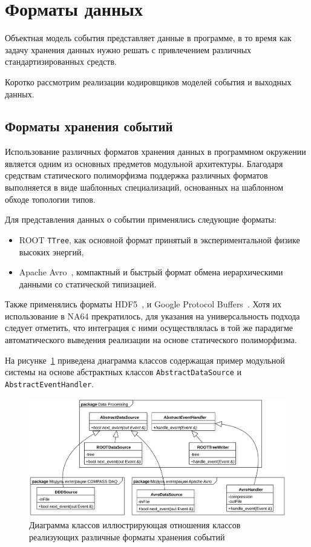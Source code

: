 \section{Форматы данных}

Объектная модель события представляет данные в программе,
в то время как задачу хранения данных нужно решать с
привлечением различных стандартизированных средств.

Коротко рассмотрим реализации кодировщиков моделей события
и выходных данных.

\subsection{Форматы хранения событий}

Использование различных форматов хранения данных в программном окружении
является одним из основных предметов модульной архитектуры.
Благодаря средствам статического полиморфизма поддержка
различных форматов выполняется в виде шаблонных
специализаций, основанных на шаблонном обходе топологии типов.

Для представления данных о событии применялись следующие форматы:
\begin{itemize}
    \item ROOT \texttt{TTree}, как основной формат принятый
    в экспериментальной физике высоких энергий,
    \item Apache Avro~\cite{avro-spec}, компактный и быстрый
    формат обмена иерархическими
    данными со статической типизацией.
\end{itemize}

Также применялись форматы HDF5~\cite{hdf5-std},
и Google Protocol Buffers~\cite{protobuf-spec}. Хотя их использование
в NA64 прекратилось, для указания на универсальность подхода следует отметить,
что интеграция с ними
осуществлялась в той же парадигме автоматического выведения
реализации на основе статического полиморфизма.

На рисунке~\ref{fig:data-sources-example} приведена диаграмма
классов содержащая пример модульной системы на основе
абстрактных классов \texttt{AbstractDataSource} и
\texttt{AbstractEventHandler}.

\begin{figure}
    \centering
    \includegraphics[width=0.95\linewidth]{images/illustrative/data-sources-example.eps}
    \caption{Диаграмма классов иллюстрирующая отношения классов реализующих различные форматы хранения событий}
    \label{fig:data-sources-example}
\end{figure}

